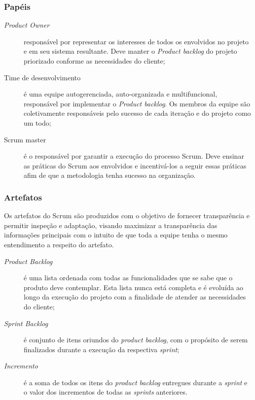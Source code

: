 \subsubsection{Papéis}

\begin{description}
    \item[\textit{Product Owner}] responsável por representar os interesses de
    todos os envolvidos no projeto e em seu sistema resultante. Deve manter o
    \textit{Product backlog} do projeto priorizado conforme as necessidades do cliente;
    \item[Time de desenvolvimento] é uma equipe autogerenciada, auto-organizada e
    multifuncional, responsável por implementar o \textit{Product backlog}. Os
    membros da equipe são coletivamente responsáveis pelo sucesso de cada iteração
    e do projeto como um todo;
    \item[Scrum master] é o responsável por garantir a execução do processo Scrum.
    Deve ensinar as práticas do Scrum aos envolvidos e incentivá-los a seguir essas
    práticas afim de que a metodologia tenha sucesso na organização.
\end{description}

\subsubsection{Artefatos}

Os artefatos do Scrum são produzidos com o objetivo de fornecer transparência e
permitir inspeção e adaptação, visando maximizar a transparência das informações
principais com o intuito de que toda a equipe tenha o mesmo entendimento a respeito
do artefato.

\begin{description}
    \item[\textit{Product Backlog}] é uma lista ordenada com todas as funcionalidades
    que se sabe que o produto deve contemplar. Esta lista nunca está completa e é
    evoluída ao longo da execução do projeto com a finalidade de atender as necessidades
    do cliente;
    \item[\textit{Sprint Backlog}] é conjunto de itens oriundos do \textit{product backlog},
    com o propósito de serem finalizados durante a execução da respectiva \textit{sprint};
    \item[\textit{Incremento}] é a soma de todos os itens do \textit{product backlog}
    entregues durante a \textit{sprint} e o valor dos incrementos de todas as \textit{sprints}
    anteriores.
\end{description}

